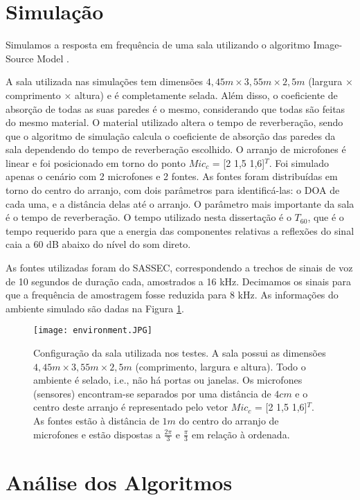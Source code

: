 \label{chap:4}
\section{Simulação}\label{sec:simulation}

Simulamos a resposta em frequência de uma sala utilizando o algoritmo Image-Source Model \cite{simulation}.

A sala utilizada nas simulações tem dimensões $4,45m \times 3,55m \times 2,5m$ (largura × comprimento × altura) e é completamente selada. Além disso, o coeficiente de absorção de todas as suas paredes é o mesmo, considerando que todas são feitas do mesmo material. O material utilizado altera o tempo de reverberação, sendo que o algoritmo de simulação calcula o coeficiente de absorção das paredes da sala dependendo do tempo de reverberação escolhido. O arranjo de microfones é linear e foi posicionado em torno do ponto $Mic_c$ = [2 1,5 1,6]$^T$. Foi simulado apenas o cenário com 2 microfones e 2 fontes. As fontes foram distribuídas em torno do centro do arranjo, com dois parâmetros para identificá-las: o DOA de cada uma, e a distância delas até o arranjo. O parâmetro mais importante da sala é o tempo de reverberação. O tempo utilizado nesta dissertação é o ${T_{60}}$, que é o tempo requerido para que a energia das componentes relativas a reflexões do sinal caia a 60 dB abaixo do nível do som direto.

As fontes utilizadas foram do SASSEC, correspondendo a trechos de sinais de voz de 10 segundos de duração cada, amostrados a 16 kHz. Decimamos os sinais para que a frequência de amostragem fosse reduzida para 8 kHz. As informações do ambiente simulado são dadas na Figura \ref{fig:environment}.

\begin{figure}
    \centering
    \texttt{[image: environment.JPG]}
    \caption{Configuração da sala utilizada nos testes. A sala possui as dimensões $4,45m \times 3,55m \times 2,5m$ (comprimento, largura e altura). Todo o ambiente é selado, i.e., não há portas ou janelas. Os microfones (sensores) encontram-se separados por uma distância de $4cm$ e o centro deste arranjo é representado pelo vetor $Mic_c$ = [2 1,5 1,6]$^T$. As fontes estão à distância de $1m$ do centro do arranjo de microfones e estão dispostas a $\frac{2\pi}{3}$ e $\frac{\pi}{3}$ em relação à ordenada.}
    \label{fig:environment}
\end{figure}


 \section{Análise dos Algoritmos}\label{sec:analysis}
    
